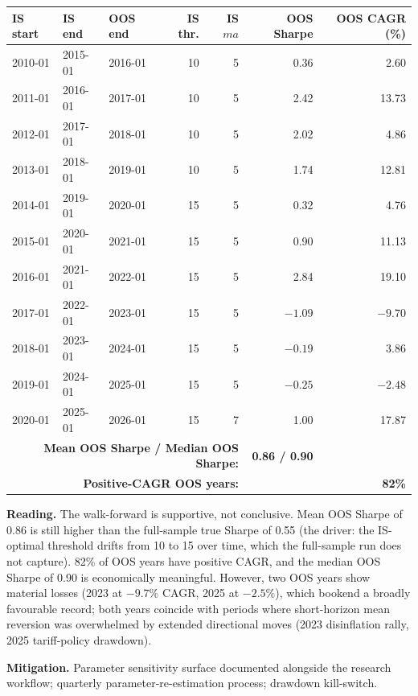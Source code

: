 \documentclass[11pt]{article}
\begin{document}
\begin{center}
\scriptsize
\begin{tabular}{l l l r r r r}
\toprule
\textbf{IS start} & \textbf{IS end} & \textbf{OOS end} & \textbf{IS thr.} & \textbf{IS $ma$} & \textbf{OOS Sharpe} & \textbf{OOS CAGR (\%)}\\
\midrule
2010-01 & 2015-01 & 2016-01 & 10 & 5 & 0.36  & 2.60\\
2011-01 & 2016-01 & 2017-01 & 10 & 5 & 2.42  & 13.73\\
2012-01 & 2017-01 & 2018-01 & 10 & 5 & 2.02  & 4.86\\
2013-01 & 2018-01 & 2019-01 & 10 & 5 & 1.74  & 12.81\\
2014-01 & 2019-01 & 2020-01 & 15 & 5 & 0.32  & 4.76\\
2015-01 & 2020-01 & 2021-01 & 15 & 5 & 0.90  & 11.13\\
2016-01 & 2021-01 & 2022-01 & 15 & 5 & 2.84  & 19.10\\
2017-01 & 2022-01 & 2023-01 & 15 & 5 & $-1.09$ & $-9.70$\\
2018-01 & 2023-01 & 2024-01 & 15 & 5 & $-0.19$ & 3.86\\
2019-01 & 2024-01 & 2025-01 & 15 & 5 & $-0.25$ & $-2.48$\\
2020-01 & 2025-01 & 2026-01 & 15 & 7 & 1.00  & 17.87\\
\midrule
\multicolumn{5}{r}{\textbf{Mean OOS Sharpe / Median OOS Sharpe:}} & \textbf{0.86 / 0.90} & \\
\multicolumn{5}{r}{\textbf{Positive-CAGR OOS years:}} & & \textbf{82\%}\\
\bottomrule
\end{tabular}
\end{center}
\newpage
\textbf{Reading.} The walk-forward is supportive, not conclusive. Mean OOS
Sharpe of 0.86 is still higher than the full-sample true Sharpe of 0.55 (the
driver: the IS-optimal threshold drifts from 10 to 15 over time, which the
full-sample run does not capture). 82\% of OOS years have positive CAGR,
and the median OOS Sharpe of 0.90 is economically meaningful. However, two
OOS years show material losses (2023 at $-9.7\%$ CAGR, 2025 at $-2.5\%$),
which bookend a broadly favourable record; both years coincide with
periods where short-horizon mean reversion was overwhelmed by extended
directional moves (2023 disinflation rally, 2025 tariff-policy drawdown).

\textbf{Mitigation.} Parameter sensitivity surface documented alongside the
research workflow; quarterly parameter-re-estimation process;
drawdown kill-switch.
\end{document}
